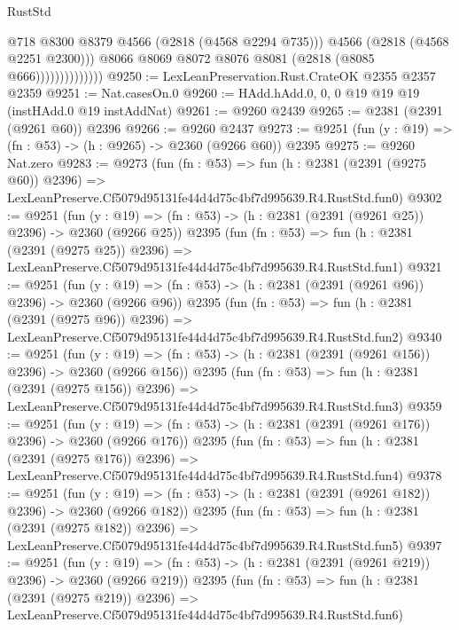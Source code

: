 \begin{lexlean}{RustStd}
\begin{coremodule}
                                @718
                                @8300
                                @8379
                                @4566
                                (@2818 (@4568 @2294 @735)))
                              @4566
                              (@2818 (@4568 @2251 @2300)))
                            @8066
                            @8069
                            @8072
                            @8076
                            @8081
                            (@2818 (@8085 @666))))))))))))))
@9250 := LexLeanPreservation.Rust.CrateOK @2355 @2357 @2359
@9251 := Nat.casesOn.{0}
@9260 := HAdd.hAdd.{0, 0, 0} @19 @19 @19 (instHAdd.{0} @19 instAddNat)
@9261 := @9260 @2439
@9265 := @2381 (@2391 (@9261 @60)) @2396
@9266 := @9260 @2437
@9273 := @9251 (fun (y : @19) => (fn : @53) -> (h : @9265) -> @2360 (@9266 @60)) @2395
@9275 := @9260 Nat.zero
@9283 := @9273
    (fun (fn : @53) =>
    fun (h : @2381 (@2391 (@9275 @60)) @2396) =>
    LexLeanPreserve.Cf5079d95131fe44d4d75c4bf7d995639.R4.RustStd.fun0)
@9302 := @9251
    (fun (y : @19) => (fn : @53) -> (h : @2381 (@2391 (@9261 @25)) @2396) -> @2360 (@9266 @25))
    @2395
    (fun (fn : @53) =>
    fun (h : @2381 (@2391 (@9275 @25)) @2396) =>
    LexLeanPreserve.Cf5079d95131fe44d4d75c4bf7d995639.R4.RustStd.fun1)
@9321 := @9251
    (fun (y : @19) => (fn : @53) -> (h : @2381 (@2391 (@9261 @96)) @2396) -> @2360 (@9266 @96))
    @2395
    (fun (fn : @53) =>
    fun (h : @2381 (@2391 (@9275 @96)) @2396) =>
    LexLeanPreserve.Cf5079d95131fe44d4d75c4bf7d995639.R4.RustStd.fun2)
@9340 := @9251
    (fun (y : @19) => (fn : @53) -> (h : @2381 (@2391 (@9261 @156)) @2396) -> @2360 (@9266 @156))
    @2395
    (fun (fn : @53) =>
    fun (h : @2381 (@2391 (@9275 @156)) @2396) =>
    LexLeanPreserve.Cf5079d95131fe44d4d75c4bf7d995639.R4.RustStd.fun3)
@9359 := @9251
    (fun (y : @19) => (fn : @53) -> (h : @2381 (@2391 (@9261 @176)) @2396) -> @2360 (@9266 @176))
    @2395
    (fun (fn : @53) =>
    fun (h : @2381 (@2391 (@9275 @176)) @2396) =>
    LexLeanPreserve.Cf5079d95131fe44d4d75c4bf7d995639.R4.RustStd.fun4)
@9378 := @9251
    (fun (y : @19) => (fn : @53) -> (h : @2381 (@2391 (@9261 @182)) @2396) -> @2360 (@9266 @182))
    @2395
    (fun (fn : @53) =>
    fun (h : @2381 (@2391 (@9275 @182)) @2396) =>
    LexLeanPreserve.Cf5079d95131fe44d4d75c4bf7d995639.R4.RustStd.fun5)
@9397 := @9251
    (fun (y : @19) => (fn : @53) -> (h : @2381 (@2391 (@9261 @219)) @2396) -> @2360 (@9266 @219))
    @2395
    (fun (fn : @53) =>
    fun (h : @2381 (@2391 (@9275 @219)) @2396) =>
    LexLeanPreserve.Cf5079d95131fe44d4d75c4bf7d995639.R4.RustStd.fun6)

\end{coremodule}
\end{lexlean}

